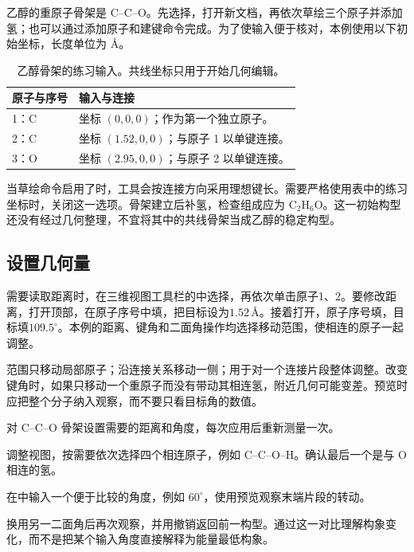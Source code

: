 乙醇的重原子骨架是 C--C--O。先选择，打开新文档，再依次草绘三个原子并添加氢；也可以通过添加原子和建键命令完成。为了使输入便于核对，本例使用以下初始坐标，长度单位为 \AA。

\begin{table}[htbp]
\centering
\caption{乙醇骨架的练习输入。共线坐标只用于开始几何编辑。}
\begin{tabularx}{\linewidth}{lX}
\toprule
原子与序号 & 输入与连接 \\
\midrule
1：C & 坐标 $(0,0,0)$；作为第一个独立原子。\\
2：C & 坐标 $(1.52,0,0)$；与原子 1 以单键连接。\\
3：O & 坐标 $(2.95,0,0)$；与原子 2 以单键连接。\\
\bottomrule
\end{tabularx}
\end{table}

当草绘命令启用了时，工具会按连接方向采用理想键长。需要严格使用表中的练习坐标时，关闭这一选项。骨架建立后补氢，检查组成应为 $\mathrm{C_2H_6O}$。这一初始构型还没有经过几何整理，不宜将其中的共线骨架当成乙醇的稳定构型。

\subsection{设置几何量}

需要读取距离时，在三维视图工具栏的中选择，再依次单击原子1、2。要修改距离，打开顶部，在原子序号中填，把目标设为$1.52\,\text{\AA}$。接着打开，原子序号填，目标填$109.5^\circ$。本例的距离、键角和二面角操作均选择移动范围，使相连的原子一起调整。

范围只移动局部原子；沿连接关系移动一侧；用于对一个连接片段整体调整。改变键角时，如果只移动一个重原子而没有带动其相连氢，附近几何可能变差。预览时应把整个分子纳入观察，而不要只看目标角的数值。

\begin{steps}
  \item 对 C--C--O 骨架设置需要的距离和角度，每次应用后重新测量一次。
  \item 调整视图，按需要依次选择四个相连原子，例如 C--C--O--H。确认最后一个是与 O 相连的氢。
  \item 在中输入一个便于比较的角度，例如 $60^\circ$，使用预览观察末端片段的转动。
  \item 换用另一二面角后再次观察，并用撤销返回前一构型。通过这一对比理解构象变化，而不是把某个输入角度直接解释为能量最低构象。
\end{steps}

